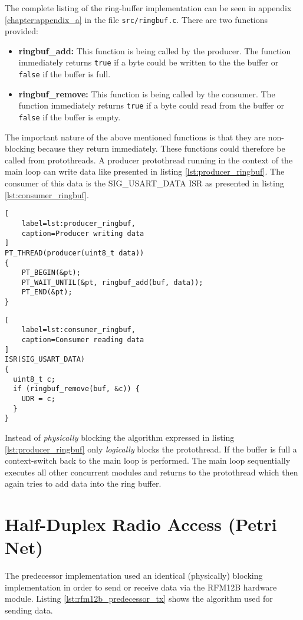 The complete listing of the ring-buffer implementation can be seen in appendix \ref{chapter:appendix_a} in the file \texttt{src/ringbuf.c}. There are two functions provided:

\begin{itemize}
\item \textbf{ringbuf\_add:} This function is being called by the producer. The function immediately returns \texttt{true} if a byte could be written to the the buffer or \texttt{false} if the buffer is full.
\item \textbf{ringbuf\_remove:} This function is being called by the consumer. The function immediately returns \texttt{true} if a byte could read from the buffer or \texttt{false} if the buffer is empty.
\end{itemize}

The important nature of the above mentioned functions is that they are non-blocking because they return immediately. These functions could therefore be called from protothreads. A producer protothread running in the context of the main loop can write data like presented in listing \ref{lst:producer_ringbuf}. The consumer of this data is the SIG\_USART\_DATA ISR as presented in listing \ref{lst:consumer_ringbuf}.

\begin{lstlisting}[
    label=lst:producer_ringbuf,
    caption=Producer writing data
]
PT_THREAD(producer(uint8_t data))
{
    PT_BEGIN(&pt);
    PT_WAIT_UNTIL(&pt, ringbuf_add(buf, data));
    PT_END(&pt);
}
\end{lstlisting}

\begin{lstlisting}[
    label=lst:consumer_ringbuf,
    caption=Consumer reading data
]
ISR(SIG_USART_DATA)
{
  uint8_t c;
  if (ringbuf_remove(buf, &c)) {
    UDR = c;
  }
}
\end{lstlisting}

Instead of \emph{physically} blocking the algorithm expressed in listing \ref{lst:producer_ringbuf} only \emph{logically} blocks the protothread. If the buffer is full a context-switch back to the main loop is performed. The main loop sequentially executes all other concurrent modules and returns to the protothread which then again tries to add data into the ring buffer.

\section{Half-Duplex Radio Access (Petri Net)}
The predecessor implementation used an identical (physically) blocking implementation in order to send or receive data via the RFM12B hardware module. Listing \ref{lst:rfm12b_predecessor_tx} shows the algorithm used for sending data.

